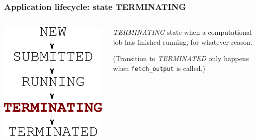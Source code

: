\documentclass[english,serif,mathserif,xcolor=pdftex,dvipsnames,table]{beamer}
\begin{document}
\begin{frame}[fragile]
\frametitle{Application lifecycle: state TERMINATING}
\begin{columns}[c]
  \begin{column}{0.5\textwidth}
    \includegraphics[height=0.7\textheight]{fig/state-TERMINATING}
  \end{column}
  \begin{column}{0.4\textwidth}
    \raggedleft

    \emph{TERMINATING} state when a computational job has finished
    running, for whatever reason.

    \+
    (Transition to \emph{TERMINATED} only happens when \texttt{fetch\_output} is called.)
  \end{column}
\end{columns}
\end{frame}
\end{document}
